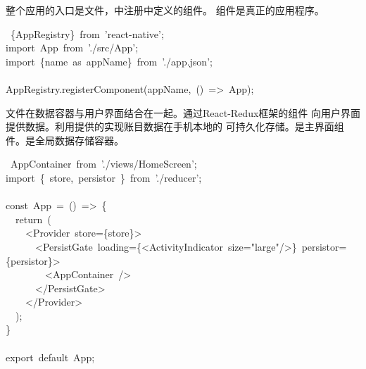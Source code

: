\documentclass{article}
\begin{document}
\noindent{}整个应用的入口是文件，中注册中定义的组件。
组件是真正的应用程序。%
\begin{mdpre}%
~\{AppRegistry\}~{from}~{'}{react-native}{'};\\
{import}~App~{from}~{'}{./src/App}{'};\\
{import}~\{name~{as}~appName\}~{from}~{'}{./app.json}{'};\\
\\
AppRegistry.registerComponent(appName,~()~=\textgreater{}~App);%
\end{mdpre}\noindent{}文件在数据容器与用户界面结合在一起。通过React-Redux框架的组件
向用户界面提供数据。利用提供的实现账目数据在手机本地的
可持久化存储。是主界面组件。是全局数据存储容器。
\begin{mdpre}%
~AppContainer~{from}~{'}{./views/HomeScreen}{'};\\
{import}~\{~store,~persistor~\}~{from}~{'}{./reducer}{'};\\
\\
{const}~App~=~()~=\textgreater{}~\{\\
~~{return}~(\\
~~~~\textless{}Provider~store=\{store\}\textgreater{}\\
~~~~~~\textless{}PersistGate~loading=\{\textless{}ActivityIndicator~size={"}{large}{"}/\textgreater{}\}~persistor=\{persistor\}\textgreater{}\\
~~~~~~~~\textless{}AppContainer~/\textgreater{}\\
~~~~~~\textless{}/PersistGate\textgreater{}\\
~~~~\textless{}/Provider\textgreater{}\\
~~);\\
\}\\
\\
{export}~{default}~App;%
\end{mdpre}
\end{document}

